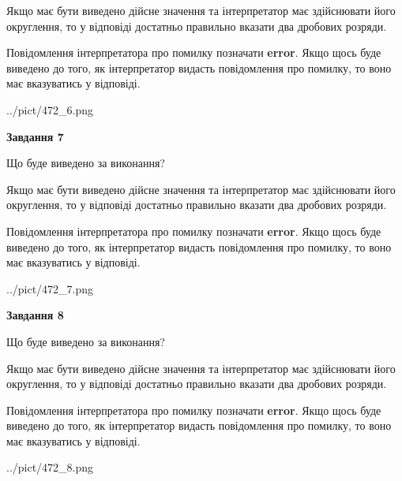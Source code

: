 \documentclass[12pt, ukrainian]{article}
\begin{document}
{\begin {Large}
Якщо має бути виведено дійсне значення та інтерпретатор має здійснювати його округлення, 
то у відповіді достатньо правильно вказати два дробових розряди.

Повідомлення інтерпретатора про помилку позначати \textbf{error}.
Якщо щось буде виведено до того, як інтерпретатор видасть повідомлення про помилку, 
то воно має вказуватись у відповіді. \par

\begin{center}
	{../pict/472_6.png}
\end{center}
\newpage

{\begin {center}\textbf{Завдання 7}\end {center}}\par
Що буде виведено за виконання? \par

Якщо має бути виведено дійсне значення та інтерпретатор має здійснювати його округлення, 
то у відповіді достатньо правильно вказати два дробових розряди.

Повідомлення інтерпретатора про помилку позначати \textbf{error}.
Якщо щось буде виведено до того, як інтерпретатор видасть повідомлення про помилку, 
то воно має вказуватись у відповіді. \par

\begin{center}
	{../pict/472_7.png}
\end{center}
\newpage

{\begin {center}\textbf{Завдання 8}\end {center}}\par
Що буде виведено за виконання? \par

Якщо має бути виведено дійсне значення та інтерпретатор має здійснювати його округлення, 
то у відповіді достатньо правильно вказати два дробових розряди.

Повідомлення інтерпретатора про помилку позначати \textbf{error}.
Якщо щось буде виведено до того, як інтерпретатор видасть повідомлення про помилку, 
то воно має вказуватись у відповіді. \par

\begin{center}
	{../pict/472_8.png}
\end{center}
\newpage


\end{Large}}
\end{document}
